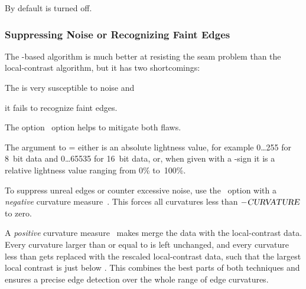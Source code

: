 By default  is turned off.


\subsubsection[Suppressing Noise or Recognizing Faint Edges]{%
  \label{sec:suppressing-noise-or-recognizing-faint-edges}%
  Suppressing Noise or Recognizing Faint Edges}

The -based algorithm is much better at resisting the seam problem than the
local-contrast algorithm, but it has two shortcomings:

\begin{compactenumerate}
\item
  The  is very susceptible to noise and

\item
  it fails to recognize faint edges.
\end{compactenumerate}

\noindent The option~ option helps to mitigate both flaws.

The argument to = either is an absolute
lightness value, for example 0\dots255 for 8~bit data and 0\dots65535 for 16~bit data, or, when
given with a \sample{\%}-sign it is a relative lightness value ranging from 0\% to~100\%.

To suppress unreal edges or counter excessive noise, use the ~option with a \emph{negative} curvature measure~.  This forces
all curvatures less than $-\textsl{CURVATURE}$ to zero.

A \emph{positive} curvature measure~ makes \App{} merge the 
data with the local-contrast data.  Every curvature larger than or equal to 
is left unchanged, and every curvature less than  gets replaced with the
rescaled local-contrast data, such that the largest local contrast is just below
.  This combines the best parts of both techniques and ensures a precise edge
detection over the whole range of edge curvatures.

\noindent{}

